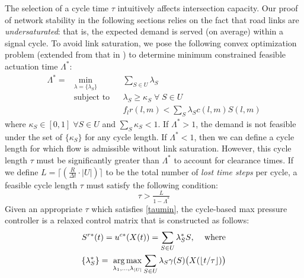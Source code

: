 The selection of a cycle time $\tau$ intuitively affects intersection capacity. Our proof of network stability in the following sections relies on the fact that road links are \emph{undersaturated}: that is, the expected demand is served (on average) within a signal cycle. To avoid link saturation, 
we pose the following convex optimization problem (extended from that in \cite{MaxPressureStochastic}) to determine minimum constrained feasible actuation time $\Lambda^*$:
\begin{equation} \label{sum_lambda}
\begin{aligned}
\Lambda ^{*} = & \min_{\lambda = \{\lambda_S\}}
& & \sum_{S\in U} \lambda_{S} \\
& \text{subject to}
& &  \lambda_{S} \geq \kappa_S \; \forall \; S\in U\\
&&& f_{l}r(l,m) < \sum_{S}\lambda_{S} c(l,m)S(l,m)
\end{aligned}
\end{equation}
where $\kappa_S \in [0,1] \; \forall S\in U$ and $\sum_S \kappa_S <1$. If $\Lambda^* > 1$, the demand is not feasible under the set of $\{\kappa_S\}$ for any cycle length. If $\Lambda^* < 1$, then we can define a cycle length for which flow is admissible without link saturation. However, this cycle length $\tau$ must be significantly greater than $\Lambda^*$ to account for clearance times. If we define $L = \lceil (\frac{R}{\Delta t} \cdot |U|) \rceil$ to be the total number of \emph{lost time steps} per cycle, a feasible cycle length $\tau$ must satisfy the following condition: 
\begin{equation} \label{taumin} \tau > \tfrac{L}{1-\Lambda^*} \end{equation} 
Given an appropriate $\tau$ which satisfies \eqref{taumin}, the cycle-based max pressure controller is a relaxed control matrix that is constructed as follows:
\begin{gather} \label{uc*} 
S^{r*}(t) = u^{c*} (X(t)) = \sum_{S \in U}\lambda_{S}^{*}S \text{, \quad where} \\
  \label{distMP_LP}
\{ \lambda^*_S \} = \;  \underset{\lambda_{1},...,\lambda_{\vert U\vert}}{ \arg \max} \sum_{S \in U}\lambda_{S}\gamma(S)\big(X(\lfloor {t}/{\tau} \rfloor)\big)
\end{gather}
